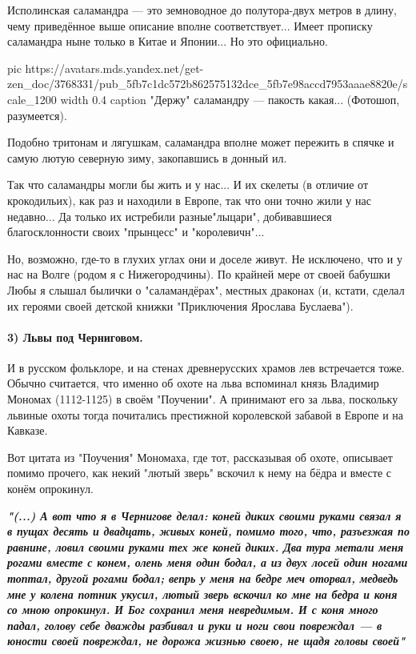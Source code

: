 Исполинская саламандра — это земноводное до полутора-двух метров в длину, чему
приведённое выше описание вполне соответствует... Имеет прописку саламандра
ныне только в Китае и Японии... Но это официально.


\ifcmt
  pic https://avatars.mds.yandex.net/get-zen_doc/3768331/pub_5fb7c1dc572b862575132dce_5fb7e98accd7953aaae8820e/scale_1200
	width 0.4
	caption "Держу" саламандру — пакость какая... (Фотошоп, разумеется).
\fi

Подобно тритонам и лягушкам, саламандра вполне может пережить в спячке и самую
лютую северную зиму, закопавшись в донный ил.

Так что саламандры могли бы жить и у нас... И их скелеты (в отличие от
крокодильих), как раз и находили в Европе, так что они точно жили у нас
недавно... Да только их истребили разные"лыцари", добивавшиеся благосклонности
своих "прынцесс" и "королевичн"...

Но, возможно, где-то в глухих углах они и доселе живут. Не исключено, что и у
нас на Волге (родом я с Нижегородчины). По крайней мере от своей бабушки Любы я
слышал былички о "саламандёрах", местных драконах (и, кстати, сделал их героями
своей детской книжки "Приключения Ярослава Буслаева").

\paragraph{3) Львы под Черниговом.}

И в русском фольклоре, и на стенах древнерусских храмов лев встречается тоже.
Обычно считается, что именно об охоте на льва вспоминал князь Владимир Мономах
(1112-1125) в своём "Поучении". А принимают его за льва, поскольку львиные
охоты тогда почитались престижной королевской забавой в Европе и на Кавказе.

Вот цитата из "Поучения" Мономаха, где тот, рассказывая об охоте, описывает
помимо прочего, как некий "лютый зверь" вскочил к нему на бёдра и вместе с
конём опрокинул.

\begin{leftbar}
  \begingroup
    \em\large\bfseries\color{blue}
"(...) А вот что я в Чернигове делал: коней диких своими руками связал я в
пущах десять и двадцать, живых коней, помимо того, что, разъезжая по
равнине, ловил своими руками тех же коней диких. Два тура метали меня
рогами вместе с конем, олень меня один бодал, а из двух лосей один ногами
топтал, другой рогами бодал; вепрь у меня на бедре меч оторвал, медведь мне
у колена потник укусил, лютый зверь вскочил ко мне на бедра и коня со мною
опрокинул. И Бог сохранил меня невредимым. И с коня много падал, голову
себе дважды разбивал и руки и ноги свои повреждал — в юности своей
повреждал, не дорожа жизнью своею, не щадя головы своей"
  \endgroup
\end{leftbar}

